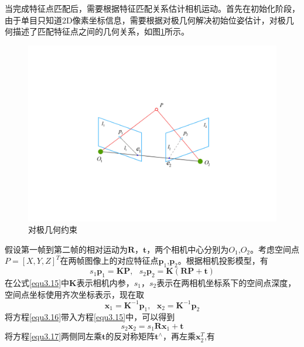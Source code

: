 当完成特征点匹配后，需要根据特征匹配关系估计相机运动。首先在初始化阶段，由于单目只知道2D像素坐标信息，需要根据对极几何解决初始位姿估计，对极几何描述了匹配特征点之间的几何关系，如图\ref{fig3.7}所示。

\begin{figure}[h]
\centering
\includegraphics[scale=0.3,angle=-90]{figures/Fig3-7.pdf}
\caption{对极几何约束}
\label{fig3.7}
\end{figure}
假设第一帧到第二帧的相对运动为$\boldsymbol{R}$，$\boldsymbol{t}$，两个相机中心分别为$O_1$,$O_2$。考虑空间点$P=[X,Y,Z]^T$在两帧图像上的对应特征点$\boldsymbol{p}_1$,$\boldsymbol{p}_2$。根据相机投影模型，有
\begin{equation}
\label{equ3.15}
s_1 \boldsymbol{p}_1 = \boldsymbol{K} \boldsymbol{P}, \ \ \ 
s_2 \boldsymbol{p}_2 = \boldsymbol{K} (\boldsymbol{R} \boldsymbol{P}+\boldsymbol{t})
\end{equation}
在公式\eqref{equ3.15}中$\boldsymbol{K}$表示相机内参，$s_1$，$s_2$表示在两相机坐标系下的空间点深度，空间点坐标使用齐次坐标表示，现在取
\begin{equation}
\label{equ3.16}
\boldsymbol{x}_1 = \boldsymbol{K}^{-1} \boldsymbol{p}_1, \ \ \ 
\boldsymbol{x}_2 = \boldsymbol{K}^{-1} \boldsymbol{p}_2
\end{equation}
将方程\eqref{equ3.16}带入方程\eqref{equ3.15}中，可以得到
\begin{equation}
\label{equ3.17}
s_2 \boldsymbol{x}_2 = s_1 \boldsymbol{R} \boldsymbol{x}_1 + \boldsymbol{t}
\end{equation}
将方程\eqref{equ3.17}两侧同左乘$\boldsymbol{t}$的反对称矩阵$\boldsymbol{t}^{\wedge}$，再左乘$\boldsymbol{x}_2^T$,有
